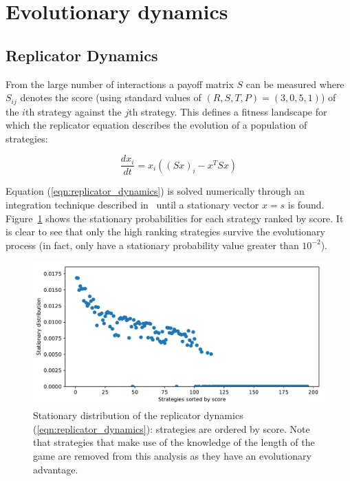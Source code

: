 \documentclass[a4paper]{article}
\begin{document}
\section{Evolutionary dynamics}\label{sec:evolutionary-dynamics}

\subsection{Replicator Dynamics}

From the large number of interactions a payoff matrix \(S\)
can be measured where \(S_{ij}\) denotes the score (using standard values of
\((R, S, T, P) = (3, 0, 5, 1)\)) of the \(i\)th strategy against the \(j\)th
strategy. This defines a fitness landscape for which the replicator equation
describes the evolution of a population of strategies:

\begin{equation}\label{eqn:replicator_dynamics}
     \frac{d x_i}{dt} = x_i ((Sx)_i - x^T S x)
\end{equation}

Equation (\ref{eqn:replicator_dynamics}) is solved numerically through an
integration technique described in~\cite{Petzold1983} until a stationary vector
\(x=s\) is found.
Figure~\ref{fig:replicator_dynamics} shows the stationary probabilities for each
strategy ranked by score.
It is clear to see that
only the high ranking strategies survive the evolutionary process (in fact,
only have a stationary
probability value greater than \(10 ^ {-2}\)).

\begin{figure}[!htbp]
    \centering
    \includegraphics[width=.8\textwidth]{./assets/img/replicator_dynamics/main.pdf}
    \caption{Stationary distribution of the replicator dynamics
    (\ref{eqn:replicator_dynamics}): strategies are ordered by score. Note that
    strategies that make use of the knowledge of the length of the game are
    removed from this analysis as they have an evolutionary advantage.}
    \label{fig:replicator_dynamics}
\end{figure}
\end{document}
